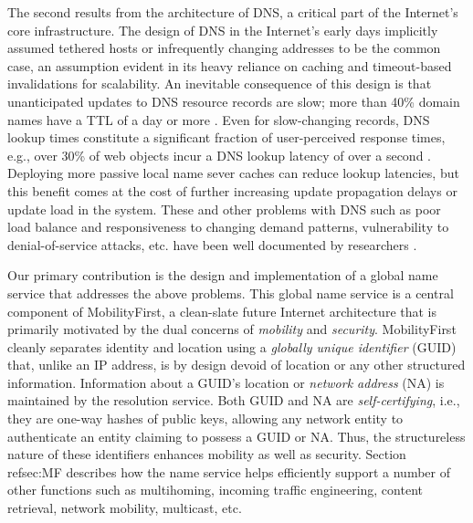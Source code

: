 {The second results from the architecture of DNS, a critical part of the Internet's core infrastructure. The design of DNS in the Internet's early days implicitly assumed tethered hosts or infrequently changing addresses to be the common case, an assumption evident in its heavy reliance on caching and timeout-based invalidations for scalability. An inevitable consequence of this design is that unanticipated updates to DNS resource records are slow; more than 40\% domain names have a TTL of a day or more \cite{codons}. Even for slow-changing records, DNS lookup times constitute a significant fraction of user-perceived response times, e.g., over 30\% of web objects incur a DNS lookup latency of over a second \cite{Jung,Huitema}. Deploying more passive local name sever caches can reduce lookup latencies, but this benefit comes at the cost of further increasing update propagation delays or update load in the system. These and other problems with DNS such as poor load balance and responsiveness to changing demand patterns, vulnerability to denial-of-service attacks, etc. have been well documented by researchers \cite{Pappas,codons,Brownlee,dnssec}.

Our primary contribution is the design and implementation of a global name service that addresses the above problems. This global name service is a central component of MobilityFirst, a clean-slate future Internet architecture that is primarily motivated by the dual concerns of {\em mobility} and {\em security}.
MobilityFirst cleanly separates identity and location using a {\em globally unique identifier} (GUID) that, unlike an IP address, is by design devoid of location or any other structured information. Information about a GUID's location or {\em network address} (NA) is maintained by the resolution service. Both GUID and NA are {\em self-certifying}, i.e., they are one-way hashes of public keys, allowing any network entity to authenticate an entity claiming to possess a GUID or NA. Thus, the structureless nature of these identifiers enhances mobility as well as security. Section \\ref{sec:MF} describes how the name service helps efficiently support a number of other functions such as multihoming, incoming traffic engineering, content retrieval, network mobility, multicast, etc.


}

